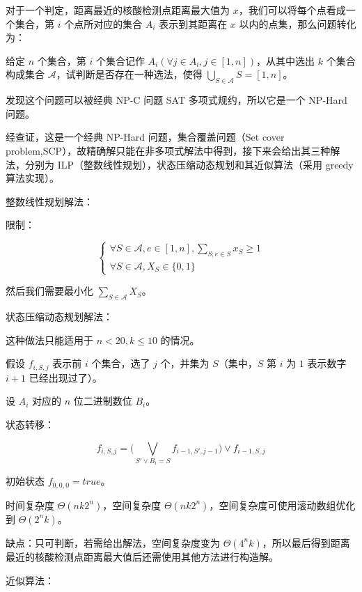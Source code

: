 \documentclass{cumcmthesis}
\begin{document}
对于一个判定，距离最近的核酸检测点距离最大值为 $x$，我们可以将每个点看成一个集合，第 $i$ 个点所对应的集合 $A_i$ 表示到其距离在 $x$ 以内的点集，那么问题转化为：

给定 $n$ 个集合，第 $i$ 个集合记作 $A_i(\forall j \in A_i, j 
\in [1,n])$，从其中选出 $k$ 个集合构成集合 $\mathscr{A}$，试判断是否存在一种选法，使得 $\bigcup\limits_{S \in \mathscr{A}} S = [1,n]$。

发现这个问题可以被经典 NP-C 问题 SAT 多项式规约，所以它是一个 NP-Hard 问题。

经查证，这是一个经典 NP-Hard 问题，集合覆盖问题（Set cover problem,SCP）\cite{wikipedia-SCP}，故精确解只能在非多项式解法中得到，接下来会给出其三种解法，分别为 ILP（整数线性规划），状态压缩动态规划和其近似算法（采用 greedy 算法实现）。

$\textbf{整数线性规划解法}$：

限制：

\begin{equation*}
\begin{cases}
\forall S \in \mathscr{A}, e \in [1,n],\sum_{S;e \in S} x_S \ge 1\\
\forall S \in \mathscr{A}, X_S \in \{0,1\}
\end{cases}
\end{equation*}

然后我们需要最小化 $\sum\limits_{S \in \mathscr{A}} X_S$。

$\textbf{状态压缩动态规划解法}$：

这种做法只能适用于 $n < 20,k \le 10$ 的情况。

假设 $f_{i,S,j}$ 表示前 $i$ 个集合，选了 $j$ 个，并集为 $S$（集中，$S$ 第 $i$ 为 $1$ 表示数字 $i+1$ 已经出现过了）。

设 $A_i$ 对应的 $n$ 位二进制数位 $B_i$。

状态转移：

\begin{equation*}
    f_{i,S,j} = \Big ( \bigvee_{S'\vee B_i = S}{f_{i-1,S',j-1}} \Big ) \vee f_{i-1,S,j}
\end{equation*}

初始状态 $f_{0,0,0} = true$。

时间复杂度 $\Theta(nk2^n)$，空间复杂度 $\Theta(nk2^n)$，空间复杂度可使用滚动数组优化到 $\Theta(2^nk)$。

缺点：只可判断，若需给出解法，空间复杂度变为 $\Theta(4^nk)$，所以最后得到距离最近的核酸检测点距离最大值后还需使用其他方法进行构造解。

$\textbf{近似算法}$：
\end{document}
